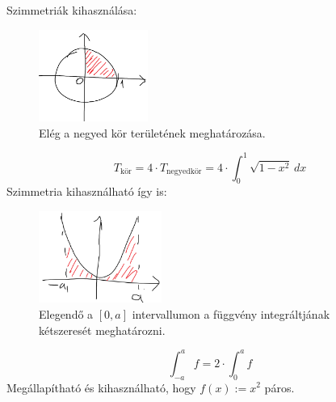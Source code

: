 \documentclass[a4paper,11.5pt]{article}
\begin{document}
		Szimmetriák kihasználása:
		\begin{figure}[H]
			\centering
			\includegraphics[height=3cm]{../2zh/kepek/06.png}
			\caption{Elég a negyed kör területének meghatározása.}
		\end{figure}
		\[ T_{\text{kör}}=4\cdot T_{\text{negyedkör}}=4\cdot\int_0^1\sqrt{1-x^2}\,dx \]
		Szimmetria kihasználható így is:
		\begin{figure}[H]
			\centering
			\includegraphics[height=3cm]{../2zh/kepek/07.png}
			\caption{Elegendő a $[0,a]$ intervallumon a függvény integráltjának kétszeresét meghatározni.}
		\end{figure}
		\[ \int_{-a}^{a}f=2\cdot\int_0^af \]
		Megállapítható és kihasználható, hogy $f(x):=x^2$ páros.
		
\end{document}
